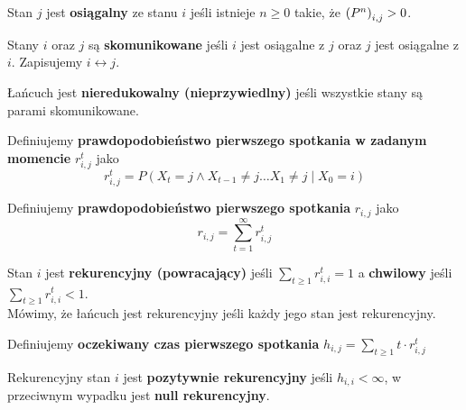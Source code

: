 \begin{definition}
	Stan \(j\) jest \textbf{osiągalny} ze stanu \(i\) jeśli istnieje \(n \geq 0\) takie, że
	\(\left(P^n\right)_{i, j} > 0\).
\end{definition}

\begin{definition}
	Stany \(i\) oraz \(j\) są \textbf{skomunikowane} jeśli \(i\) jest osiągalne z \(j\) oraz
	\(j\) jest osiągalne z \(i\). Zapisujemy \( i \leftrightarrow j \).
\end{definition}

\begin{definition}
	Łańcuch jest \textbf{nieredukowalny (nieprzywiedlny)} jeśli wszystkie stany są parami skomunikowane.
\end{definition}

\begin{definition}
	Definiujemy \textbf{prawdopodobieństwo pierwszego spotkania w zadanym momencie} \(r_{i, j}^t\)
	jako
	\[
		r_{i, j}^t = P(X_t = j \land X_{t-1} \neq j \dots X_{1} \neq j \mid X_0 = i)
	\]
\end{definition}

\begin{definition}
	Definiujemy \textbf{prawdopodobieństwo pierwszego spotkania} \(r_{i, j}\)
	jako
	\[
		r_{i, j} = \sum_{t=1}^{\infty} r_{i,j}^{t}
	\]
\end{definition}

\begin{definition}
	Stan \(i\) jest \textbf{rekurencyjny (powracający)} jeśli \( \sum_{t \geq 1} r_{i, i}^t = 1 \)
	a \textbf{chwilowy} jeśli \( \sum_{t \geq 1} r_{i, i}^t < 1 \). \\
	Mówimy, że łańcuch jest rekurencyjny jeśli każdy jego stan jest rekurencyjny.
\end{definition}

\begin{definition}
	Definiujemy \textbf{oczekiwany czas pierwszego spotkania} \(h_{i, j} = \sum_{t \geq 1} t \cdot r_{i, j}^t\)
\end{definition}

\begin{definition}
	Rekurencyjny stan \(i\) jest \textbf{pozytywnie rekurencyjny} jeśli \(h_{i, i} < \infty\),
	w przeciwnym wypadku jest \textbf{null rekurencyjny}.
\end{definition}

